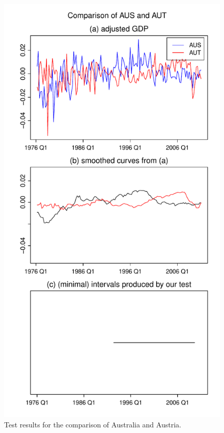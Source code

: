 \documentclass[a4paper,12pt]{article}
\begin{document}
{\begin{figure}[p!]
\begin{minipage}[t]{0.49\textwidth}
\includegraphics[width=\textwidth]{plots/AUS_vs_AUT}
\caption{Test results for the comparison of Australia and Austria.}\label{fig:Australia:Austria}
\end{minipage}
\hspace{0.25cm}

\end{figure}}
\end{document}
